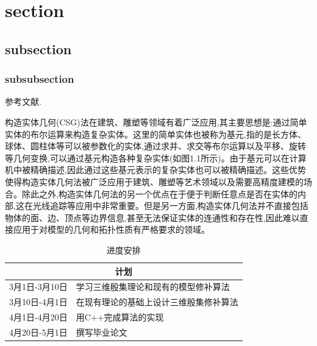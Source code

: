 
\section{section}

\subsection{subsection}

\subsubsection{subsubsection}

\indent 参考文献\cite{attene2010lightweight}.

\begin{multicols}{3}
    构造实体几何(CSG)法在建筑、雕塑等领域有着广泛应用,其主要思想是:通过简单实体的布尔运算来构造复杂实体。这里的简单实体也被称为基元,指的是长方体、球体、圆柱体等可以被参数化的实体,通过求并、求交等布尔运算以及平移、旋转等几何变换,可以通过基元构造各种复杂实体(如图1.1所示)。由于基元可以在计算机中被精确描述,因此通过这些基元表示的复杂实体也可以被精确描述。这些优势使得构造实体几何法被广泛应用于建筑、雕塑等艺术领域以及需要高精度建模的场合。除此之外,构造实体几何法的另一个优点在于便于判断任意点是否在实体的内部,这在光线追踪等应用中非常重要。但是另一方面,构造实体几何法并不直接包括物体的面、边、顶点等边界信息,甚至无法保证实体的连通性和存在性,因此难以直接应用于对模型的几何和拓扑性质有严格要求的领域。
\end{multicols}

\begin{table}[!htbp]
    \centering
    \label{table1}
    \caption{进度安排}
    \begin{tabular}{|l|l|}
        \hline
        \multicolumn{2}{|c|}{计划} \\
        \hline
        3月1日-3月10日 & 学习三维殷集理论和现有的模型修补算法 \\
        \hline
        3月10日-4月1日 & 在现有理论的基础上设计三维殷集修补算法 \\
        \hline
        4月1日-4月20日 & 用C++完成算法的实现 \\
        \hline
        4月20日-5月1日 & 撰写毕业论文 \\
        \hline
    \end{tabular}
\end{table}

